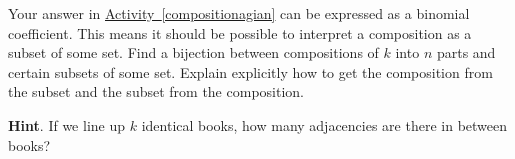 \documentclass{book}
\begin{document}
\setcounter{cpjt}{129}
\addtocounter{cpjt}{-1}
\begin{activity}\label{activity-122}
\hypertarget{p-865}{}%
Your answer in \hyperref[compositionagian]{Activity~\ref{compositionagian}} can be expressed as a binomial coefficient. This means it should be possible to interpret a composition as a subset of some set. Find a bijection between compositions of \(k\) into \(n\) parts and certain subsets of some set.  Explain explicitly how to get the composition from the subset and the subset from the composition.%
\par\smallskip%
\noindent\textbf{Hint}.\hypertarget{hint-87}{}\quad%
\hypertarget{p-866}{}%
If we line up \(k\) identical books, how many adjacencies are there in between books?%
\par\smallskip%
\noindent\end{activity}

\clearpage
\end{document}
